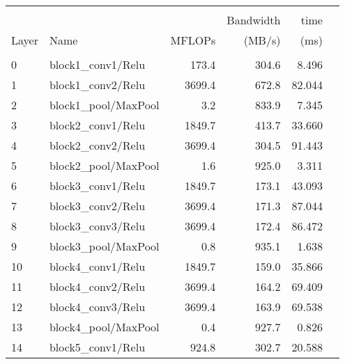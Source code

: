 \begin{tabular}{llrrrr}
\rowcolor{light-gray}	\multicolumn{5}{l}{Detailed Per Layer Profile}\\
\rowcolor{light-gray}	    		&                                           		&      			&	Bandwidth   & time\\
\rowcolor{light-gray}	Layer    & Name                                      & 	MFLOPs 	&	(MB/s)   		& (ms)\\
\rowcolor{light-gray}	\multicolumn{5}{l}{======================================================================}\\
\rowcolor{light-gray}	0  &  block1\_conv1/Relu                   		&   173.4  	&	 304.6 		&  8.496\\
\rowcolor{light-gray}	1  &  block1\_conv2/Relu                   		&  3699.4  	&	 672.8 		& 82.044\\
\rowcolor{light-gray}	2  &  block1\_pool/MaxPool                 		&     3.2  	&	 833.9 		&  7.345\\
\rowcolor{light-gray}	3  &  block2\_conv1/Relu                   		&  1849.7  	&	 413.7 		& 33.660\\
\rowcolor{light-gray}	4  &  block2\_conv2/Relu                   		&  3699.4  	&	 304.5 		& 91.443\\
\rowcolor{light-gray}	5  &  block2\_pool/MaxPool                 		&     1.6  	&	 925.0 		&  3.311\\
\rowcolor{light-gray}	6  &  block3\_conv1/Relu                   		&  1849.7  	&	 173.1 		& 43.093\\
\rowcolor{light-gray}	7  &  block3\_conv2/Relu                   		&  3699.4  	&	 171.3 		& 87.044\\
\rowcolor{light-gray}	8  &  block3\_conv3/Relu                   		&  3699.4  	&	 172.4 		& 86.472\\
\rowcolor{light-gray}	9  &  block3\_pool/MaxPool                 		&     0.8  	&	 935.1 		& 1.638\\
\rowcolor{light-gray}	10 &  block4\_conv1/Relu                   		&  1849.7  	&	 159.0 		& 35.866\\
\rowcolor{light-gray}	11 &  block4\_conv2/Relu                   		&  3699.4  	&	 164.2 		& 69.409\\
\rowcolor{light-gray}	12 &  block4\_conv3/Relu                   		&  3699.4  	&	 163.9 		& 69.538\\
\rowcolor{light-gray}	13 &  block4\_pool/MaxPool                 		&     0.4  	&	 927.7 		&  0.826\\
\rowcolor{light-gray}	14 &  block5\_conv1/Relu                   		&   924.8  	&	 302.7 		& 20.588\\

\end{tabular}
